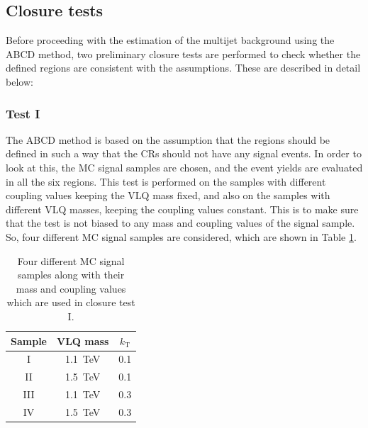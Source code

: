\subsection{Closure tests}
\label{sec:abcd:implementation:closuretests}
Before proceeding with the estimation of the multijet background using the ABCD method, two preliminary closure tests are performed to check whether the defined regions are consistent with the assumptions. These are described in detail below: 

\subsubsection{Test I}
\label{sec:abcd:implementation:closuretests:testi}
The ABCD method is based on the assumption that the regions should be defined in such a way that the CRs should not have any signal events. In order to look at this, the MC signal samples are chosen, and the event yields are evaluated in all the six regions. This test is performed on the samples with different coupling values keeping the VLQ mass fixed, and also on the samples with different VLQ masses, keeping the coupling values constant. This is to make sure that the test is not biased to any mass and coupling values of the signal sample. So, four different MC signal samples are considered, which are shown in Table \ref{table:abcd:implementation:closuretests:testi:samples}.
\begin{table}[hbt!]
	\centering
	\begin{tabular}{c|c|c} 
		\toprule
		\textbf{Sample} & \textbf{VLQ mass} & \textbf{$k_\text{T}$} \\
		\midrule
		I & \SI{1.1}{\tera\electronvolt} & 0.1 \\
		II & \SI{1.5}{\tera\electronvolt} & 0.1 \\
		III & \SI{1.1}{\tera\electronvolt} & 0.3 \\
		IV & \SI{1.5}{\tera\electronvolt} & 0.3 \\
		\bottomrule
	\end{tabular}
	\caption{Four different MC signal samples along with their mass and coupling values which are used in closure test I. }
	\label{table:abcd:implementation:closuretests:testi:samples}
\end{table}

